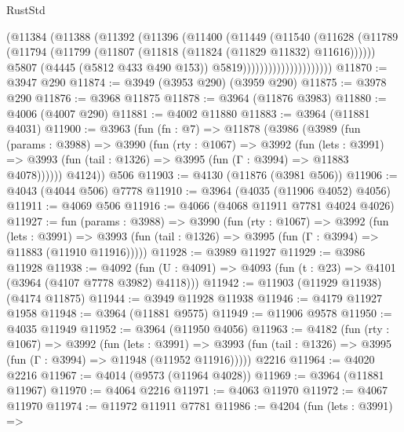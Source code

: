 \begin{lexlean}{RustStd}
\begin{coremodule}
{\begin{coremodule}
{{{{{{{{{{{{{{{{{{{{{{{{{{{{{{{{{{{{{{                              (@11384
                                (@11388
                                  (@11392
                                    (@11396
                                      (@11400
                                        (@11449
                                          (@11540
                                            (@11628
                                              (@11789
                                                (@11794
                                                  (@11799
                                                    (@11807
                                                      (@11818 (@11824 (@11829 @11832) @11616))))))
                                              @5807
                                              (@4445 (@5812 @433 @490 @153))
                                              @5819)))))))))))))))))))))
@11870 := @3947 @290
@11874 := @3949 (@3953 @290) (@3959 @290)
@11875 := @3978 @290
@11876 := @3968 @11875
@11878 := @3964 (@11876 @3983)
@11880 := @4006 (@4007 @290)
@11881 := @4002 @11880
@11883 := @3964 (@11881 @4031)
@11900 := @3963
    (fun (fn : @7) =>
    @11878
      (@3986
        (@3989
          (fun (params : @3988) =>
          @3990
            (fun (rty : @1067) =>
            @3992
              (fun (lets : @3991) =>
              @3993 (fun (tail : @1326) => @3995 (fun (Γ : @3994) => @11883 @4078))))))
        @4124))
    @506
@11903 := @4130 (@11876 (@3981 @506))
@11906 := @4043 (@4044 @506) @7778
@11910 := @3964 (@4035 (@11906 @4052) @4056)
@11911 := @4069 @506
@11916 := @4066 (@4068 @11911 @7781 @4024 @4026)
@11927 := fun (params : @3988) =>
  @3990
    (fun (rty : @1067) =>
    @3992
      (fun (lets : @3991) =>
      @3993 (fun (tail : @1326) => @3995 (fun (Γ : @3994) => @11883 (@11910 @11916)))))
@11928 := @3989 @11927
@11929 := @3986 @11928
@11938 := @4092
    (fun (U : @4091) => @4093 (fun (t : @23) => @4101 (@3964 (@4107 @7778 @3982) @4118)))
@11942 := @11903 (@11929 @11938) (@4174 @11875)
@11944 := @3949 @11928 @11938
@11946 := @4179 @11927 @1958
@11948 := @3964 (@11881 @9575)
@11949 := @11906 @9578
@11950 := @4035 @11949
@11952 := @3964 (@11950 @4056)
@11963 := @4182
    (fun (rty : @1067) =>
    @3992
      (fun (lets : @3991) =>
      @3993 (fun (tail : @1326) => @3995 (fun (Γ : @3994) => @11948 (@11952 @11916)))))
    @2216
@11964 := @4020 @2216
@11967 := @4014 (@9573 (@11964 @4028))
@11969 := @3964 (@11881 @11967)
@11970 := @4064 @2216
@11971 := @4063 @11970
@11972 := @4067 @11970
@11974 := @11972 @11911 @7781
@11986 := @4204
    (fun (lets : @3991) =>
}}}}}}}}}}}}}}}}}}}}}}}}}}}}}}}}}}}}}}
\end{coremodule}}
\end{coremodule}
\end{lexlean}
